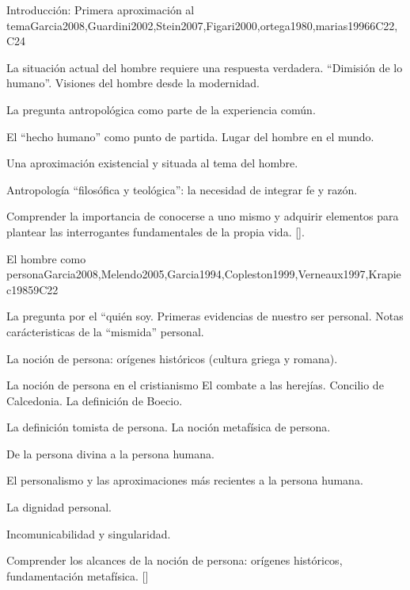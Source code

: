 \begin{syllabus}
\begin{unit}{}{Introducción: Primera aproximación al tema}{Garcia2008,Guardini2002,Stein2007,Figari2000,ortega1980,marias1996}{6}{C22,C24}
\begin{topics}
	\item La situación actual del hombre requiere una respuesta verdadera. ``Dimisión de lo humano''. Visiones del hombre desde la modernidad.
	\item La pregunta antropológica como parte de la experiencia común.
	\item El ``hecho humano'' como punto de partida. Lugar del hombre en el mundo.
	\item Una aproximación existencial y situada al tema del hombre.
	\item Antropología ``filosófica y teológica'': la necesidad de integrar fe y razón.
\end{topics}

\begin{learningoutcomes}
	\item Comprender la importancia de conocerse a uno mismo y adquirir elementos para plantear las interrogantes fundamentales de la propia vida. [\Usage].
\end{learningoutcomes}
\end{unit}

\begin{unit}{}{El hombre como persona}{Garcia2008,Melendo2005,Garcia1994,Copleston1999,Verneaux1997,Krapiec1985}{9}{C22}
\begin{topics}
	\item La pregunta por el ``quién soy.
		\subitem Primeras evidencias de nuestro ser personal.
		\subitem Notas carácteristicas de la ``mismida'' personal.
	\item La noción de persona: orígenes históricos (cultura griega y romana).
	\item La noción de persona en el cristianismo
		\subitem El combate a las herejías.
		\subitem Concilio de Calcedonia. 
		\subitem La definición de Boecio.
	\item La definición tomista de persona.
		\subitem La noción metafísica de persona.
	\item De la persona divina a la persona humana.
	\item El personalismo y las aproximaciones más recientes a la persona humana.
	\item La dignidad personal.
	\item Incomunicabilidad y singularidad.
\end{topics}
\begin{learningoutcomes}
	\item Comprender los alcances de la noción de persona: orígenes históricos, fundamentación metafísica. [\Usage]
\end{learningoutcomes}
\end{unit}


\end{syllabus}
